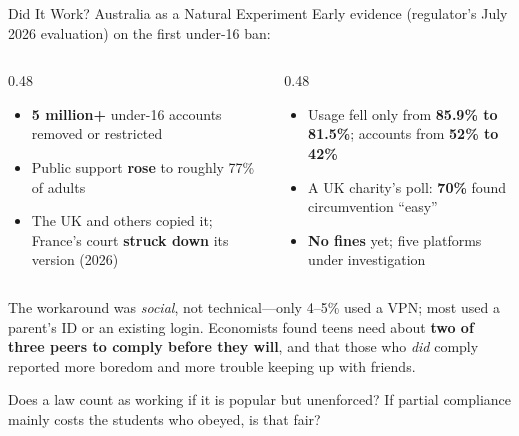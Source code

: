 ﻿\documentclass[aspectratio=169,11pt]{beamer}
\begin{document}
\begin{frame}{Did It Work? Australia as a Natural Experiment}
Early evidence (regulator's July 2026 evaluation) on the first under-16 ban:

\vspace{0.2em}
\begin{columns}[T]
\begin{column}{0.48\textwidth}
\begin{probox}
\scriptsize
\begin{itemize}
    \item \textbf{5 million+} under-16 accounts removed or restricted
    \item Public support \textbf{rose} to roughly 77\% of adults
    \item The UK and others copied it; France's court \textbf{struck down} its version (2026)
\end{itemize}
\end{probox}
\end{column}
\begin{column}{0.48\textwidth}
\begin{objectionbox}
\scriptsize
\begin{itemize}
    \item Usage fell only from \textbf{85.9\% to 81.5\%}; accounts from \textbf{52\% to 42\%}
    \item A UK charity's poll: \textbf{70\%} found circumvention ``easy''
    \item \textbf{No fines} yet; five platforms under investigation
\end{itemize}
\end{objectionbox}
\end{column}
\end{columns}

\vspace{0.2em}
{\scriptsize The workaround was \emph{social}, not technical---only 4--5\% used a VPN; most used a parent's ID or an existing login. Economists found teens need about \textbf{two of three peers to comply before they will}, and that those who \emph{did} comply reported more boredom and more trouble keeping up with friends.}

\begin{discussionbox}[Discussion]
Does a law count as working if it is popular but unenforced? If partial compliance mainly costs the students who obeyed, is that fair?
\end{discussionbox}
\end{frame}
\end{document}
